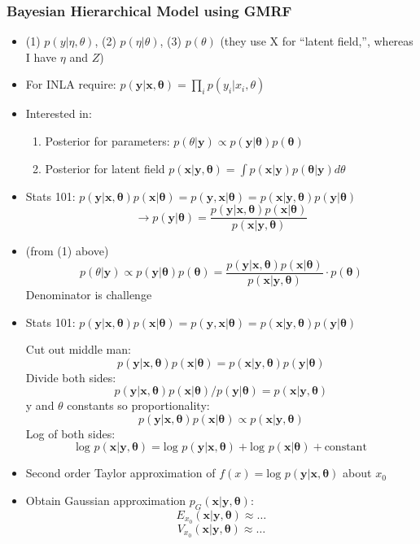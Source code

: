\documentclass{article}
\begin{document}
\subsubsection*{Bayesian Hierarchical Model using GMRF}
\begin{itemize}
\item (1) $p(y|\eta, \theta)$, (2) $p(\eta|\theta)$, (3) $p(\theta)$ (they use X for ``latent field,'', whereas I have $\eta$ and $Z$)
\item For INLA require: $p(\pmb{y}|\pmb{x}, \pmb{\theta}) = \prod_{i} p(y_{i}|x_{i},\theta) $ 
\item Interested in:
  \begin{enumerate}
  \item Posterior for parameters: $p(\theta|\pmb{y}) \propto p(\pmb{y}|\pmb{\theta})p(\pmb{\theta})$
  \item Posterior for latent field $p(\pmb{x} | \pmb{y}, \pmb{\theta}) = \int p(\pmb{x} | \pmb{y}) p(\pmb{\theta}|\pmb{y}) d\theta$
  \end{enumerate}
\item Stats 101: $p(\pmb{y} | \pmb{x}, \pmb{\theta}) p(\pmb{x} | \pmb{\theta}) =
p(\pmb{y} , \pmb{x} | \pmb{\theta}) = p(\pmb{x} | \pmb{y}, \pmb{\theta}) p(\pmb{y} | \pmb{\theta})$
$$\rightarrow p(\pmb{y} | \pmb{\theta}) = \frac{p(\pmb{y} | \pmb{x}, \pmb{\theta}) p(\pmb{x} | \pmb{\theta})}{p(\pmb{x} | \pmb{y}, \pmb{\theta})}$$

\item (from (1) above) $$p(\theta|\pmb{y}) \propto p(\pmb{y}|\pmb{\theta})p(\pmb{\theta}) = \frac{p(\pmb{y} | \pmb{x}, \pmb{\theta}) p(\pmb{x} | \pmb{\theta})}{p(\pmb{x} | \pmb{y}, \pmb{\theta})} \cdot p(\pmb{\theta})$$ Denominator is challenge

\item Stats 101: $p(\pmb{y} | \pmb{x}, \pmb{\theta}) p(\pmb{x} | \pmb{\theta}) =
p(\pmb{y} , \pmb{x} | \pmb{\theta}) = p(\pmb{x} | \pmb{y}, \pmb{\theta}) p(\pmb{y} | \pmb{\theta})$ 

Cut out middle man:
$$p(\pmb{y} | \pmb{x}, \pmb{\theta}) p(\pmb{x} | \pmb{\theta}) = p(\pmb{x} | \pmb{y}, \pmb{\theta}) p(\pmb{y} | \pmb{\theta})$$
Divide both sides:
$$p(\pmb{y} | \pmb{x}, \pmb{\theta}) p(\pmb{x} | \pmb{\theta})/ p(\pmb{y} | \pmb{\theta})=  p(\pmb{x} | \pmb{y}, \pmb{\theta})$$
y and $\theta$ constants so proportionality:
$$p(\pmb{y} | \pmb{x}, \pmb{\theta}) p(\pmb{x} | \pmb{\theta}) \propto  p(\pmb{x} | \pmb{y}, \pmb{\theta})$$
Log of both sides:
$$\text{log } p(\pmb{x} | \pmb{y}, \pmb{\theta}) = \text{log } p(\pmb{y} | \pmb{x}, \pmb{\theta}) + \text{log } p(\pmb{x} | \pmb{\theta}) + \text{constant}$$
\item Second order Taylor approximation of $f(x) = \text{log } p(\pmb{y} | \pmb{x}, \pmb{\theta})$ about $x_{0}$
\item Obtain Gaussian approximation $p_{G}(\pmb{x} | \pmb{y}, \pmb{\theta})$:
$$ E_{x_{0}}(\pmb{x|y,\theta}) \approx \dots $$
$$  V_{x_{0}}(\pmb{x|y,\theta}) \approx \dots $$
\end{itemize}
\end{document}
